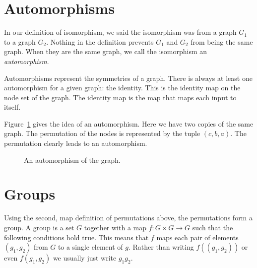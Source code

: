 \documentclass{iansnotes}
\begin{document}
\section{Automorphisms}
  In our definition of isomorphism, we said the isomorphism was from a graph $G_1$ to a graph $G_2$.
  Nothing in the definition prevents $G_1$ and $G_2$ from being the same graph.
  When they are the same graph, we call the isomorphism an \emph{automorphism}.

  Automorphisms represent the symmetries of a graph.
  There is always at least one automorphism for a given graph: the identity.
  This is the identity map on the node set of the graph.
  The identity map is the map that maps each input to itself.

  Figure~\ref{figure:autmorphism} gives the idea of an automorphism.
  Here we have two copies of the same graph.
  The permutation of the nodes is represented by the tuple $(c,b,a)$.
  The permutation clearly leads to an automorphism.

  \begin{figure}
    \centering
    \caption{An automorphism of the graph.}
    \label{figure:autmorphism}
  \end{figure}


\section{Groups}
  Using the second, map definition of permutations above, the permutations form a group.
  A group is a set $G$ together with a map $f: G \times G \rightarrow G$ such that the following conditions hold true.
  This means that $f$ maps each pair of elements $(g_1,g_2)$ from $G$ to a single element of $g$.
  Rather than writing $f((g_1,g_2))$ or even $f(g_1,g_2)$ we usually just write $g_1g_2$.
  
\end{document}
